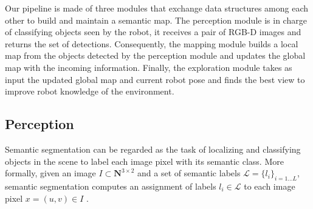 \documentclass{article}
\begin{document}
	Our pipeline is made of three modules that exchange data structures among each other to build and maintain a semantic map. The perception module is in charge of classifying objects seen by the robot, it receives a pair of RGB-D images and returns the set of detections. Consequently, the mapping module builds a local map from the objects detected by the perception module and updates the global map with the incoming information. Finally, the exploration module takes as input the updated global map and current robot pose and finds the best view to improve robot knowledge of the environment.
	
	\subsection*{Perception}
	
%	
	
	Semantic segmentation can be regarded as the task of localizing and classifying objects in the scene to label each image pixel with its semantic class.
	More formally, given an image $I \subset \mathbf{N}^{3 \times 2}$ and a set of semantic labels $\mathcal{L} = \{l_i\}_{i=1 \dots L}$, semantic segmentation computes an assignment of labels $l_i \in \mathcal{L}$ to each image pixel $x = (u,v) \in I$ .
	
\end{document}
